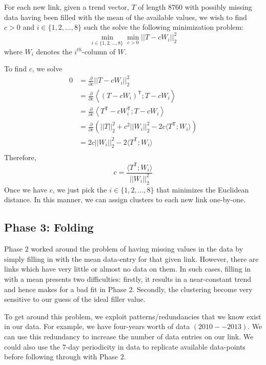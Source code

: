 \documentclass[10pt,a4paper]{amsart}
\begin{document}
For each new link, given a trend vector, \(T\) of length \(8760\) with
possibly missing data having been filled with the mean of the available
values, we wish to find \(c>0\) and \(i\in\{1,2,\ldots,8\}\) such the
solve the following minimization problem:
	\[\min_{i\in\{1,2,\ldots,8\}}\min_{c>0}||T-cW_i||_2^2\]
where \(W_i\) denotes the \(i^{th}\)-column of \(W\).

To find \(c\), we solve
\begin{align*}
	0 	&= \frac{\partial}{\partial c}||T-cW_i||_2^2 \\
		&= \frac{\partial}{\partial c}\left\langle (T-cW_i)^\mathsf{T};
				T-cW_i\right\rangle \\
		&= \frac{\partial}{\partial c}\left\langle T^\mathsf{T}
				-cW_i^\mathsf{T}; T-cW_i\right\rangle \\
		&= \frac{\partial}{\partial c}\left(||T||_2^2 + c^2||W_i||_2^2
				- 2c\langle T^\mathsf{T};W_i\rangle\right) \\
		&= 2c||W_i||_2^2 - 2\langle T^\mathsf{T};W_i\rangle \\
\end{align*}
Therefore,
	\[c = \frac{\langle T^\mathsf{T};W_i\rangle}{||W_i||_2^2}\]
Once we have \(c\), we just pick the \(i\in\{1,2,\ldots,8\}\) that minimizes
the Euclidean distance. In this manner, we can assign clusters to each new
link one-by-one.

\subsection{Phase 3: Folding}
Phase \(2\) worked around the problem of having missing values in the data by
simply filling in with the mean data-entry for that given link. However, there
are links which have very little or almost no data on them. In such cases,
filling in with a mean presents two difficulties: firstly, it results in a
near-constant trend and hence makes for a bad fit in Phase \(2\). Secondly,
the clustering become very sensitive to our guess of the ideal filler value.

To get around this problem, we exploit patterns/redundancies that we know
exist in our data. For example, we have four-years worth of data \((2010--
2013)\). We can use this redundancy to increase the number of data entries on
our link. We could also use the \(7\)-day periodicity in data to replicate
available data-points before following through with Phase \(2\).
\end{document}
